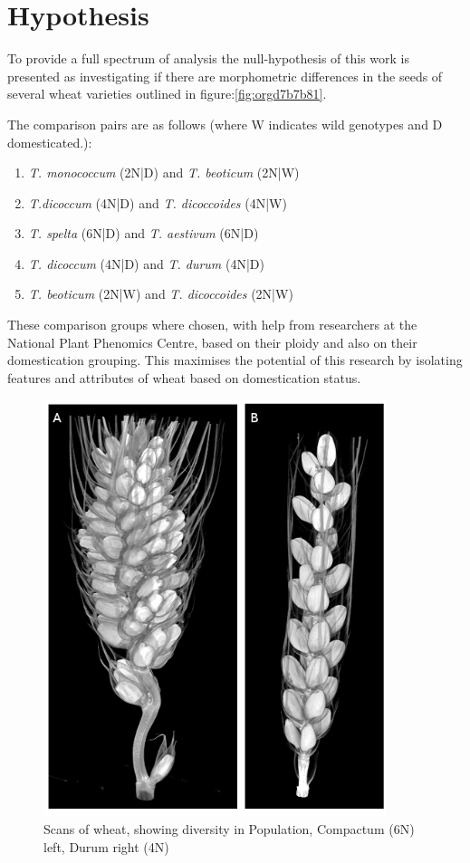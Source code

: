 \documentclass[11pt]{report}
\begin{document}
\section{Hypothesis}
\label{sec:org0a4d6eb}
To provide a full spectrum of analysis the null-hypothesis of this work is presented as investigating if there are morphometric differences in the seeds of several wheat varieties outlined in figure:\ref{fig:orgd7b7b81}.

The comparison pairs are as follows (where W indicates wild genotypes and D domesticated.):

\begin{enumerate}
\item \emph{T. monococcum} (2N|D) and \emph{T. beoticum} (2N|W)
\item \emph{T.dicoccum} (4N|D) and \emph{T. dicoccoides} (4N|W)
\item \emph{T. spelta} (6N|D) and \emph{T. aestivum} (6N|D)
\item \emph{T. dicoccum} (4N|D) and \emph{T. durum} (4N|D)
\item \emph{T. beoticum} (2N|W) and \emph{T. dicoccoides} (2N|W)
\end{enumerate}

These comparison groups where chosen, with help from researchers at the National Plant Phenomics Centre, based on their ploidy and also on their domestication grouping. This maximises the potential of this research by isolating features and attributes of wheat based on domestication status.
\begin{figure}[htbp]
\centering
\includegraphics[width=10cm]{./images/spikes.png}
\caption{\label{fig:org1b10f51}
Scans of wheat, showing diversity in Population, Compactum (6N) left, Durum right (4N)}
\end{figure}
\end{document}
